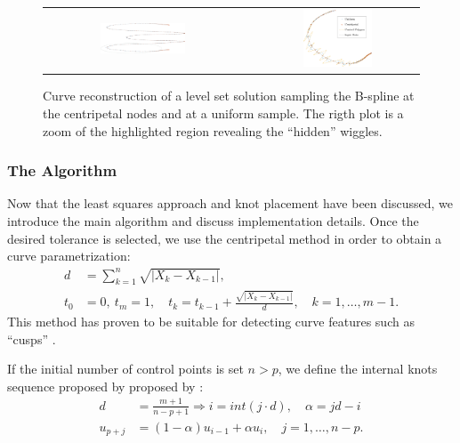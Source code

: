  
 \begin{figure}
  \centering
  \begin{tabular}{ccc}
  \includegraphics[width=0.45\textwidth,height= 0.3\textwidth]{ellipse-crop}&&
  \includegraphics[width=0.45\textwidth,height= 0.3\textwidth]{wiggle_ALL-crop}
  \end{tabular}
\caption{\label{fig:bspline_wiggle}Curve reconstruction of a level set solution sampling the B-spline at 
the centripetal nodes and at a uniform sample. The rigth plot is a zoom of the highlighted region revealing the ``hidden'' wiggles.}
 \end{figure}


\subsubsection{The Algorithm}
Now that the least squares approach and knot placement have been discussed, we introduce the main algorithm and discuss implementation 
details. Once the desired tolerance is selected, we use the centripetal method in order to obtain a curve parametrization: 
\begin{align}
 d &= \sum_{k=1}^n \sqrt {| X_k-X_{k-1}|},\\
 t_0 &=0,\ t_m=1,\quad t_k = t_{k-1} + \frac{\sqrt{|X_k-X_{k-1}|}}{d},\quad k = 1,\ldots, m-1.
 \end{align}
This method has proven to be suitable for detecting curve features such as ``cusps'' \cite{}. 
\begin{note}
 If the initial number of control points is set $n > p$, we define the internal knots sequence proposed by proposed by \cite{}: 
  \begin{align}
  d &= \frac{m+1}{n-p+1} \Rightarrow i = int(j\cdot d),\quad \alpha = jd -i\\
  u_{p+j} &= (1-\alpha)u_{i-1} + \alpha u_i,\quad j = 1,\ldots,n-p.
 \end{align}
\end{note}

